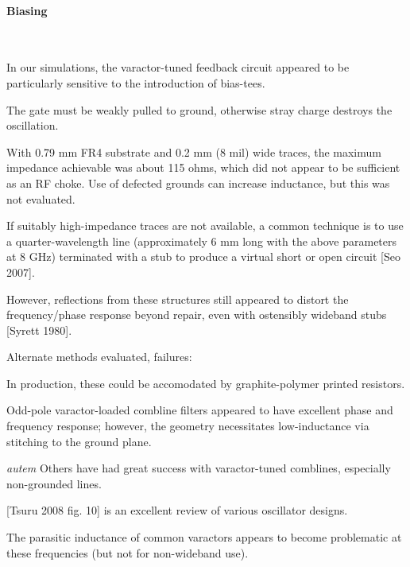 \documentclass[paper.tex]{subfiles}
\begin{document}
\paragraph{Biasing}\

In our simulations, the varactor-tuned feedback circuit appeared to be particularly sensitive to the introduction of bias-tees. 


The gate must be weakly pulled to ground, otherwise stray charge destroys the oscillation.




With 0.79 mm FR4 substrate and 0.2 mm (8 mil) wide traces, the maximum impedance achievable was about 115 ohms, which did not appear to be sufficient as an RF choke. Use of defected grounds can increase inductance, but this was not evaluated.

If suitably high-impedance traces are not available, a common technique is to use a quarter-wavelength line (approximately 6 mm long with the above parameters at 8 GHz) terminated with a stub to produce a virtual short or open circuit [Seo 2007]. 

However, reflections from these structures still appeared to distort the frequency/phase response beyond repair, even with ostensibly wideband stubs [Syrett 1980].

\noindent{}

Alternate methods evaluated, failures: 


In production, these could be accomodated by graphite-polymer printed resistors. 


Odd-pole varactor-loaded combline filters appeared to have excellent phase and frequency response; however, the geometry necessitates low-inductance via stitching to the ground plane.

\begin{autem}
	{\it autem} Others have had great success with varactor-tuned comblines, especially non-grounded lines.
\end{autem}

[Tsuru 2008 fig. 10] is an excellent review of various oscillator designs.

The parasitic inductance of common varactors appears to become problematic at these frequencies (but not for non-wideband use).
\end{document}
